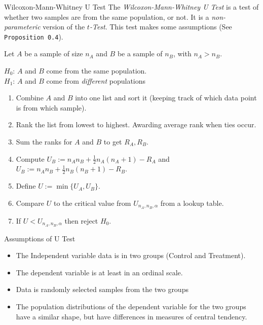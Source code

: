 \documentclass[11pt,a4paper]{article}
\begin{document}
  \begin{definition}{Wilcoxon-Mann-Whitney U Test}
    The \textit{Wilcoxon-Mann-Whitney U Test} is a test of whether two samples are from the same population, or not. It is a \textit{non-parameteric} version of the \textit{$t$-Test}. This test makes some assumptions (See \texttt{Proposition 0.4}).
    \par Let $A$ be a sample of size $n_A$ and $B$ be a sample of $n_B$, with $n_A>n_B$.
    \begin{center}$H_0$: $A$ and $B$ come from the same population.\\$H_1$: $A$ and $B$ come from \textit{different} populations\end{center}
    \begin{enumerate}
      \item Combine $A$ and $B$ into one list and sort it (keeping track of which data point is from which sample).
      \item Rank the list from lowest to highest. Awarding average rank when ties occur.
      \item Sum the ranks for $A$ and $B$ to get $R_A,R_B$.
      \item Compute $U_B:=n_An_B+\frac12n_A(n_A+1)-R_A$ and $U_B:=n_An_B+\frac12n_B(n_B+1)-R_B$.
      \item Define $U:=\min\{U_A,U_B\}$.
      \item Compare $U$ to the critical value from $U_{n_A,n_B,\alpha}$ from a lookup table.
      \item If $U<U_{n_A,n_B,\alpha}$ then reject $H_0$.
    \end{enumerate}
  \end{definition}

  \begin{proposition}{Assumptions of U Test}
    \begin{itemize}
      \item The Independent variable data is in two groups (Control and Treatment).
      \item The dependent variable is at least in an ordinal scale.
      \item Data is randomly selected samples from the two groups
      \item The population distributions of the dependent variable for the two groups have a similar shape, but have differences in measures of central tendency.
    \end{itemize}
  \end{proposition}
\end{document}
